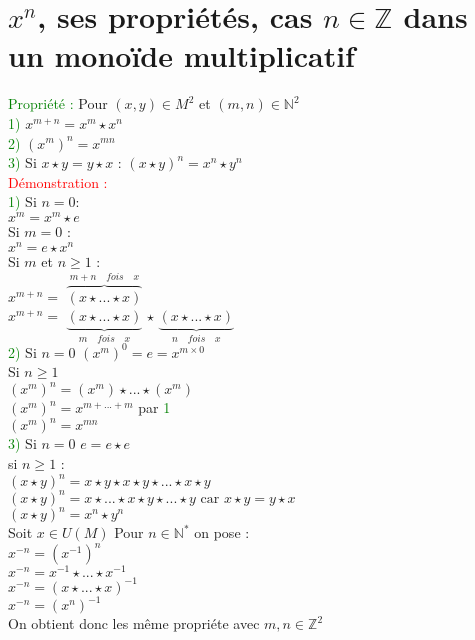 \documentclass{article}
\begin{document}
	\section{$x^n$, ses propriétés, cas $n \in \mathbb{Z}$ dans un monoïde multiplicatif}
	\textcolor{green}{Propriété :} Pour $(x,y) \in M^2$ et $(m,n) \in \mathbb{N}^2$ \\
	\indent\textcolor{green}{1)} $ x^{m+n} = x^m \star x^n$ \\
	\indent \textcolor{green}{2)} $(x^m)^n=x^{mn}$ \\
	\indent \textcolor{green}{3)} Si $x \star y =y \star x$ : $(x \star y)^n=x^n \star y^n$ \\
	\textcolor{red}{Démonstration :} \\
	\textcolor{green}{1)} Si $n=0 :$ \\
	\indent $x^m =x^m \star e$ \\
	Si $m=0$ : \\
	\indent $x^n=e \star x^n$ \\
	Si $m$ et $n \geq 1$ : \\
$x^{m+n} =$ $\overbrace{(x \star ... \star x)}^{m + n \quad fois \quad x}$ \vspace{0.5cm}\\
$x^{m+n} =$ $\underbrace{(x \star ... \star x)}_{m \quad fois \quad x}$ $\star$ $\underbrace{(x \star ... \star x)}_{n \quad fois \quad x}$ \vspace{0.5cm}\\
	\textcolor{green}{2)} Si $n=0$ $(x^m)^0=e=x^{m\times 0}$ \\
	Si $n \geq 1$ \\
	\indent $ (x^m)^n =(x^m) \star ... \star (x^m)$ \\
	\indent $(x^m)^n=x^{m+...+m}$ par \textcolor{green}{1} \\
	\indent $(x^m)^n=x^{mn}$
	\\
	\textcolor{green}{3)} Si $n=0$ $e=e \star e$ \\
	si $n \geq 1$ : \\
	 \indent $(x\star y)^n =x \star y \star x \star y \star ... \star x \star y$ \\
\indent $(x\star y)^n	  = x \star ... \star x \star y \star ... \star y \text{ car }  x \star y = y \star x$ \\
\indent $(x\star y)^n	  = x^n \star y^n$ \\
Soit $x \in U(M)$ Pour $n \in \mathbb{N}^*$ on pose : \\
\indent $x^{-n} =(x^{-1})^n $ \\
\indent $x^{-n}	= x^{-1} \star ... \star x^{-1}$ \\
\indent $x^{-n}	=(x \star ... \star x)^{-1}$ \\
	\indent $x^{-n}=(x^n)^{-1}  $ \\
On obtient donc les m\^eme propri\'ete avec $m,n \in \mathbb{Z}^2$
\end{document}
